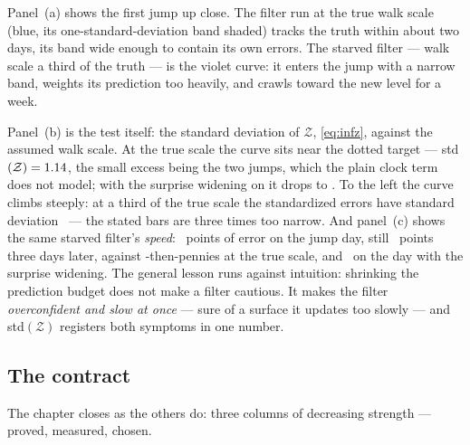 Panel~(a) shows the first jump up close.  The filter run at the
true walk scale (blue, its one-standard-deviation band shaded)
tracks the truth within about two days, its band wide enough to
contain its own errors.  The starved filter --- walk scale a third
of the truth --- is the violet curve: it enters the jump with a
narrow band, weights its prediction too heavily, and crawls toward
the new level for a week.

Panel~(b) is the test itself: the standard deviation of
$\mathcal{Z}$, \cref{eq:infz}, against the assumed walk scale.  At
the true scale the curve sits near the dotted target ---
std$(\mathcal{Z})=1.14$, the small excess being
the two jumps, which the plain clock term does not model; with the
surprise widening on it drops to \MacFiltAuditZstdGated.  To the
left the curve climbs steeply: at a third of the true scale the
standardized errors have standard deviation
\MacFiltAuditZstdStarved\ --- the stated bars are three times too
narrow.  And panel~(c) shows the same starved filter's
\emph{speed}: \MacFiltAuditDayZeroStarved\ points of error on the
jump day, still \MacFiltAuditDayThreeStarved\ points three days
later, against \MacFiltAuditDayZeroHonest-then-pennies at the true
scale, and \MacFiltAuditDayZeroGate\ on the day with the surprise
widening.  The general lesson runs against intuition: shrinking the
prediction budget does not make a filter cautious.  It makes the
filter \emph{overconfident and slow at once} --- sure of a surface
it updates too slowly --- and std$(\mathcal{Z})$ registers both
symptoms in one number.

\subsection{The contract}

The chapter closes as the others do: three columns of decreasing
strength --- proved, measured, chosen.

